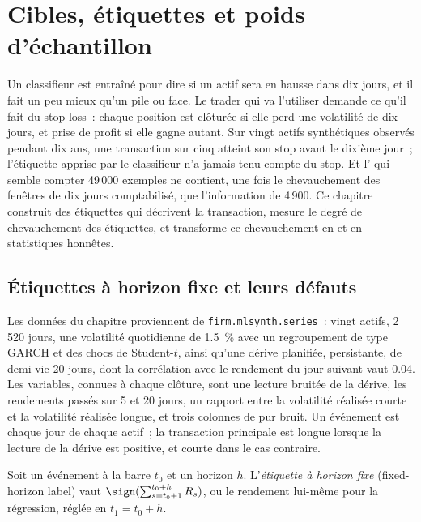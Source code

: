 \chapter{Cibles, étiquettes et poids d'échantillon}\label{ch:ml:targets-labels-and-sample-weights}

Un classifieur est entraîné pour dire si un actif sera en hausse dans dix jours, et il fait un peu mieux qu'un pile ou
face. Le trader qui va l'utiliser demande ce qu'il fait du stop-loss~: chaque position est clôturée si elle perd une volatilité de dix jours,
et prise de profit si elle gagne autant. Sur vingt actifs synthétiques observés pendant dix ans, une transaction sur cinq atteint
son stop avant le dixième jour~; l'étiquette apprise par le classifieur n'a jamais tenu compte du stop. Et l'
qui semble compter 49\,000 exemples ne contient, une fois le chevauchement des fenêtres de dix jours comptabilisé, que l'information de 4\,900. Ce chapitre construit
des étiquettes qui décrivent la transaction, mesure le degré de chevauchement des étiquettes, et transforme ce chevauchement en 
et en statistiques honnêtes.

\section{Étiquettes à horizon fixe et leurs défauts}

Les données du chapitre proviennent de \texttt{firm.mlsynth.series}~: vingt actifs, 2\,520 jours, une volatilité quotidienne de 1.5~\% avec
un regroupement de type GARCH et des chocs de Student-$t$, ainsi qu'une dérive planifiée, persistante, de demi-vie 20 jours, dont la corrélation
avec le rendement du jour suivant vaut 0.04. Les variables, connues à chaque clôture, sont une lecture bruitée de la dérive, les rendements passés sur 5 et
20 jours, un rapport entre la volatilité réalisée courte et la volatilité réalisée longue, et trois colonnes de pur bruit. Un événement est chaque jour
de chaque actif~; la transaction principale est longue lorsque la lecture de la dérive est positive, et courte dans le cas contraire.

\begin{definition}\label{def:ml:targets-labels-and-sample-weights:fixed}
Soit un événement à la barre $t_0$ et un horizon $h$. L'\emph{étiquette à horizon fixe} (fixed-horizon label) vaut
$\sign(\sum_{s=t_0+1}^{t_0+h}R_s)$, ou le rendement lui-même pour la régression, réglée en $t_1 = t_0 + h$.
\end{definition}

